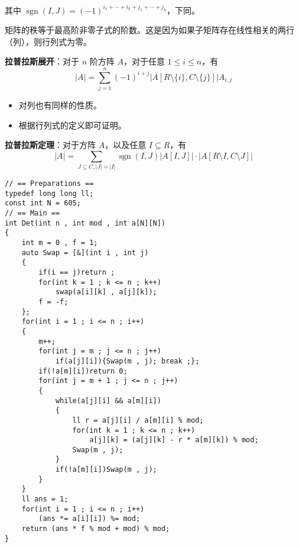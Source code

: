 其中 $\operatorname{sgn}(I,J)=(-1)^{i_1+\cdots+i_k+j_1+\cdots+j_k}$，下同。

矩阵的秩等于最高阶非零子式的阶数。这是因为如果子矩阵存在线性相关的两行（列），则行列式为零。

\begin{tcolorbox}
    \textbf{拉普拉斯展开}：对于 $n$ 阶方阵 $A$，对于任意 $1\le i\le n$，有
    $$|A|=\sum_{j=1}^{n} (-1)^{i+j}|A[R\setminus\{i\},C\setminus \{j\}]|A_{i,j}$$
\end{tcolorbox}
\begin{itemize}
    \item 对列也有同样的性质。
    \item 根据行列式的定义即可证明。
\end{itemize}

\begin{tcolorbox}
    \textbf{拉普拉斯定理}：对于方阵 $A$，以及任意 $I\subseteq R$，有
    $$|A|=\sum_{J\subseteq C,|J|=|I|} \operatorname{sgn}(I,J)|A[I,J]|\cdot|A[R\setminus I,C\setminus J]|$$
\end{tcolorbox}

\begin{verbatim}
// == Preparations ==
typedef long long ll;
const int N = 605;
// == Main ==
int Det(int n , int mod , int a[N][N])
{
    int m = 0 , f = 1;
    auto Swap = [&](int i , int j)
    {
        if(i == j)return ;
        for(int k = 1 ; k <= n ; k++)
            swap(a[i][k] , a[j][k]);
        f = -f;
    };
    for(int i = 1 ; i <= n ; i++)
    {
        m++;
        for(int j = m ; j <= n ; j++)
            if(a[j][i]){Swap(m , j); break ;};
        if(!a[m][i])return 0;
        for(int j = m + 1 ; j <= n ; j++)
        {
            while(a[j][i] && a[m][i])
            {
                ll r = a[j][i] / a[m][i] % mod;
                for(int k = 1 ; k <= n ; k++)
                    a[j][k] = (a[j][k] - r * a[m][k]) % mod;
                Swap(m , j);
            }
            if(!a[m][i])Swap(m , j);
        }
    }
    ll ans = 1;
    for(int i = 1 ; i <= n ; i++)
        (ans *= a[i][i]) %= mod;
    return (ans * f % mod + mod) % mod;
}
\end{verbatim}